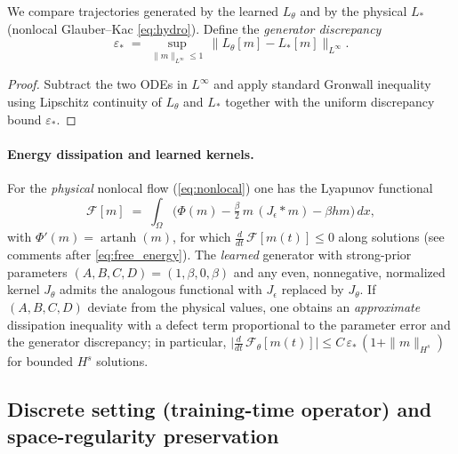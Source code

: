 \documentclass[11pt,a4paper]{article}
\theoremstyle{plain}
\newtheorem{proposition}[theorem]{Proposition}
\theoremstyle{definition}
\theoremstyle{remark}
\begin{document}
We compare trajectories generated by the learned $L_\theta$ and by the physical $L_\ast$ (nonlocal Glauber--Kac \eqref{eq:hydro}). Define the \emph{generator discrepancy}
\[
	\varepsilon_* \;=\; \sup_{\|m\|_{L^\infty}\le 1}\, \big\| L_\theta[m] - L_\ast[m] \big\|_{L^\infty}.
\]


\begin{proof}
	Subtract the two ODEs in $L^\infty$ and apply standard Gronwall inequality using Lipschitz continuity of $L_\theta$ and $L_\ast$ together with the uniform discrepancy bound $\varepsilon_*$.\qedhere
\end{proof}

\paragraph{Energy dissipation and learned kernels.}
For the \emph{physical} nonlocal flow (\eqref{eq:nonlocal}) one has the Lyapunov functional
\[
	\mathcal{F}[m] \;=\; \int_\Omega \Big( \Phi(m) - \tfrac{\beta}{2}\,m\, (J_\epsilon*m) - \beta h m \Big)\,dx,
\]
with $\Phi'(m)=\operatorname{artanh}(m)$, for which $\tfrac{d}{dt}\,\mathcal{F}[m(t)]\le 0$ along solutions (see comments after \eqref{eq:free_energy}). The \emph{learned} generator with strong-prior parameters $(A,B,C,D)=(1,\beta,0,\beta)$ and any even, nonnegative, normalized kernel $J_\theta$ admits the analogous functional with $J_\epsilon$ replaced by $J_\theta$. If $(A,B,C,D)$ deviate from the physical values, one obtains an \emph{approximate} dissipation inequality with a defect term proportional to the parameter error and the generator discrepancy; in particular, $\big|\tfrac{d}{dt}\,\mathcal{F}_\theta[m(t)]\big| \le C\,\varepsilon_*\,(1+\|m\|_{H^s})$ for bounded $H^s$ solutions.

\subsection{Discrete setting (training-time operator) and space-regularity preservation}
\label{subsec:discrete}
\end{document}
